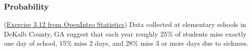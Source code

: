 \documentclass[12pt]{exam}
\newcounter{countA}
\begin{document}
\subsubsection*{Probability}\label{probability}
\begin{questions}
\setcounter{question}{\value{countA}}
%
%
\question
  (\href{http://people.hsc.edu/faculty-staff/blins/books/OpenIntroStats4e.pdf\#eoce.3.12}{Exercise 3.12 from OpenIntro Statistics}) Data collected at elementary schools in DeKalb County, GA suggest that
  each year roughly 25\% of students miss exactly one day of school,
  15\% miss 2 days, and 28\% miss 3 or more days due to sickness.


\end{questions}
\end{document}
